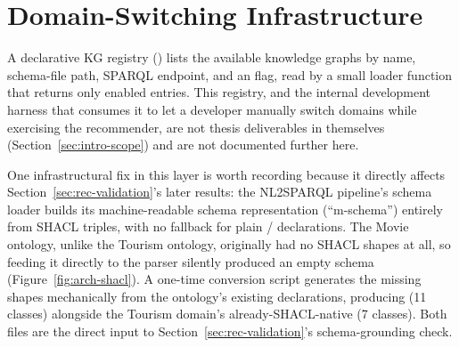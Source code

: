 \section{Domain-Switching Infrastructure}
\label{sec:arch-domain}

A declarative KG registry () lists the available knowledge graphs by name,
schema-file path, SPARQL endpoint, and an  flag, read by a small loader function that
returns only enabled entries. This registry, and the internal development harness that consumes it
to let a developer manually switch domains while exercising the recommender, are not thesis
deliverables in themselves (Section~\ref{sec:intro-scope}) and are not documented further here.

One infrastructural fix in this layer is worth recording because it directly affects
Section~\ref{sec:rec-validation}'s later results: the NL2SPARQL pipeline's schema loader builds its
machine-readable schema representation (``m-schema'') entirely from SHACL 
triples, with no fallback for plain / declarations. The Movie
ontology, unlike the Tourism ontology, originally had no SHACL shapes at all, so feeding it directly
to the parser silently produced an empty schema (Figure~\ref{fig:arch-shacl}). A one-time conversion
script generates the missing shapes mechanically from the ontology's existing 
declarations, producing  (11 classes) alongside the Tourism domain's
already-SHACL-native  (7 classes). Both files are the direct input to
Section~\ref{sec:rec-validation}'s schema-grounding check.

